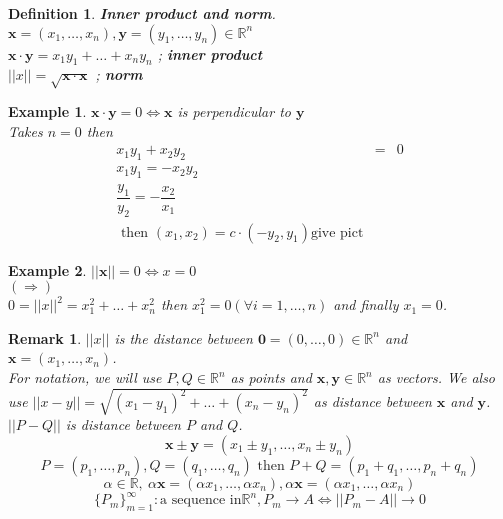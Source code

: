 \documentclass[a4paper,10pt]{article}
\newtheorem{remark}{Remark}
\newtheorem{defi}{Definition}
\newtheorem{ex}{Example}
\begin{document}
\begin{defi}
	\textbf{Inner product and norm}.\\
	$ \mathbf{x} = (x_{1}, \dots, x_{n}) , \mathbf{y} = (y_{1}, \dots, y_{n}  ) \in \mathbb{R}^n $\\
	$ \mathbf{x} \cdot \mathbf{y} = x_{1}y_{1} + \dots + x_{n}y_{n} $ ; \textbf{inner product}\\
	$ ||x|| = \sqrt{\mathbf{x} \cdot \mathbf{x}} $ ; \textbf{norm}
\end{defi}

\begin{ex}
	$ \mathbf{x} \cdot \mathbf{y} =0 \Leftrightarrow \mathbf{x} $ is perpendicular to $ \mathbf{y} $\\
	Takes $ n=0 $ then
	\begin{eqnarray} \nonumber
	x_{1}y_{1} + x_{2}y_{2} &=& 0 \\ \nonumber
	x_{1}y_{1} = -x_{2}y_{2} \\ \nonumber
	\dfrac{y_{1}}{y_{2}} = - \dfrac{x_{2}}{x_{1}}\\ \nonumber
	\text{ then } (x_{1},x_{2}) = c \cdot(-y_{2},y_{1})
	\text{give pict}
	\end{eqnarray}
\end{ex}

\begin{ex}
	$ ||\mathbf{x}||=0 \Leftrightarrow x=0$\\
	$ (\Rightarrow) $\\
	$ 0 = ||x||^2 = x_{1}^2 + \dots + x_{n}^2 $ then $ x_{1}^2 =0 (\forall i =1, \dots, n )$ and finally $ x_{1}=0 $.
\end{ex}

\begin{remark}
	$ ||x|| $ is the distance between $ \mathbf{0} = (0, \dots, 0) \in \mathbb{R}^n $ and $ \mathbf{x}= (x_{1}, \dots, x_{n}) $.\\
	For notation, we will use $ P,Q \in \mathbb{R}^n $ as points and $ \mathbf{x}, \mathbf{y} \in \mathbb{R}^n $ as vectors. We also use $ ||x-y|| = \sqrt{(x_{1}-y_{1})^2 + \dots + (x_{n}-y_{n})^2} $ as distance between $ \mathbf{x} $ and $ \mathbf{y} $.  $ ||P-Q|| $ is distance between $ P $ and $ Q $.
	\[ \mathbf{x} \pm \mathbf{y} = ( x_{1} \pm y_{1} , \dots, x_{n} \pm y_{n} ) \]
	\[ P=(p_{1}, \dots, p_{n}) ,  Q = (q_{1}, \dots, q_{n})  \text{ then } P+Q = (p_{1}+q_{1}, \dots, p_{n}+q_{n}) \]
	\[ \alpha \in \mathbb{R}, \ \alpha\mathbf{x} = (\alpha x_{1}, \dots, \alpha x_{n}),  \alpha\mathbf{x} = (\alpha x_{1}, \dots, \alpha x_{n})\]
	\[  \{P_{m}\}_{m=1}^{\infty} : \text{a sequence in} \mathbb{R}^n , P_{m} \rightarrow A \Leftrightarrow ||P_{m}-A|| \rightarrow 0 \]
\end{remark}
\end{document}
